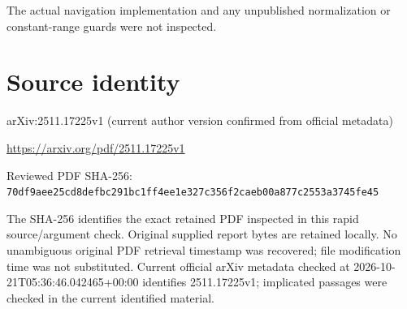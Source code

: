\documentclass[11pt]{article}
\begin{document}
The actual navigation implementation and any unpublished normalization or constant-range guards were not inspected.\par

\section*{Source identity}

arXiv:2511.17225v1 (current author version confirmed from official metadata)

\url{https://arxiv.org/pdf/2511.17225v1}

Reviewed PDF SHA-256: \nolinkurl{70df9aee25cd8defbc291bc1ff4ee1e327c356f2caeb00a877c2553a3745fe45}

The SHA-256 identifies the exact retained PDF inspected in this rapid source/argument check. Original supplied report bytes are retained locally. No unambiguous original PDF retrieval timestamp was recovered; file modification time was not substituted. Current official arXiv metadata checked at 2026-10-21T05:36:46.042465+00:00 identifies 2511.17225v1; implicated passages were checked in the current identified material.
\end{document}
